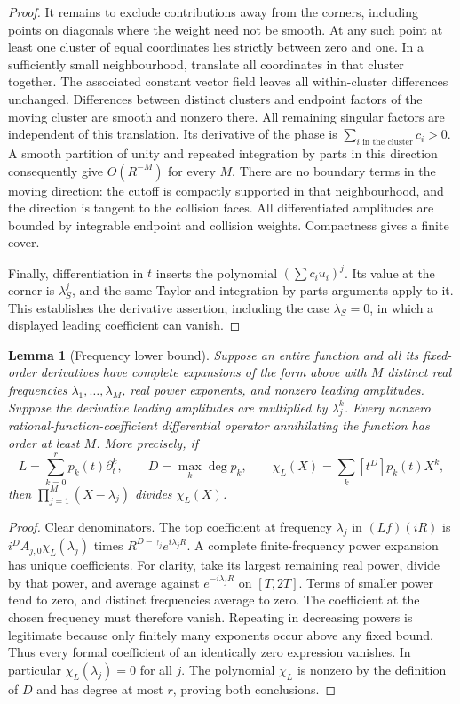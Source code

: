 \documentclass[11pt,a4paper]{article}
\newtheorem{lemma}[theorem]{Lemma}
\theoremstyle{definition}
\theoremstyle{remark}
\numberwithin{equation}{section}
\begin{document}
\begin{proof}
It remains to exclude contributions away from the corners, including
points on diagonals where the weight need not be smooth.  At any such
point at least one cluster of equal coordinates lies strictly between
zero and one.  In a sufficiently small neighbourhood, translate all
coordinates in that cluster together.  The associated constant vector
field leaves all within-cluster differences unchanged.  Differences
between distinct clusters and endpoint factors of the moving cluster
are smooth and nonzero there.  All remaining singular factors are
independent of this translation.  Its derivative of the phase is
$\sum_{i\text{ in the cluster}}c_i>0$.  A smooth partition of unity
and repeated integration by parts in this direction consequently
give $O(R^{-M})$ for every $M$.  There are no boundary terms in the
moving direction: the cutoff is compactly supported in that
neighbourhood, and the direction is tangent to the collision faces.
All differentiated amplitudes are bounded by integrable endpoint
and collision weights.  Compactness gives a finite cover.

Finally, differentiation in $t$ inserts the polynomial
$(\sum c_i u_i)^j$.  Its value at the corner is $\lambda_S^j$,
and the same Taylor and integration-by-parts arguments apply to it.
This establishes the derivative assertion, including the case
$\lambda_S=0$, in which a displayed leading coefficient can vanish.
\end{proof}

\begin{lemma}[Frequency lower bound]\label{p1:lem:JT-order-bound}
Suppose an entire function and all its fixed-order derivatives have
complete expansions of the form above with $M$ distinct real
frequencies $\lambda_1,\ldots,\lambda_M$, real power exponents, and
nonzero leading amplitudes.  Suppose the derivative leading amplitudes
are multiplied by $\lambda_j^k$.  Every nonzero rational-function-coefficient
differential operator annihilating the function has order at least $M$.
More precisely, if
\[
 L=\sum_{k=0}^r p_k(t)\partial_t^k,\qquad
 D=\max_k\deg p_k,\qquad
 \chi_L(X)=\sum_k[t^D]p_k(t)X^k,
\]
then $\prod_{j=1}^M(X-\lambda_j)$ divides $\chi_L(X)$.
\end{lemma}

\begin{proof}
Clear denominators.  The top coefficient at frequency $\lambda_j$
in $(Lf)(iR)$ is $i^D A_{j,0}\chi_L(\lambda_j)$ times
$R^{D-\gamma_j}e^{i\lambda_jR}$.  A complete finite-frequency
power expansion has unique coefficients.  For clarity, take its
largest remaining real power, divide by that power, and average
against $e^{-i\lambda_jR}$ on $[T,2T]$.  Terms of smaller power tend
to zero, and distinct frequencies average to zero.  The coefficient
at the chosen frequency must therefore vanish.  Repeating in
decreasing powers is legitimate because only finitely many exponents
occur above any fixed bound.  Thus every formal coefficient of an
identically zero expression vanishes.  In particular
$\chi_L(\lambda_j)=0$ for all $j$.  The polynomial $\chi_L$ is
nonzero by the definition of $D$ and has degree at most $r$, proving
both conclusions.
\end{proof}
\end{document}
